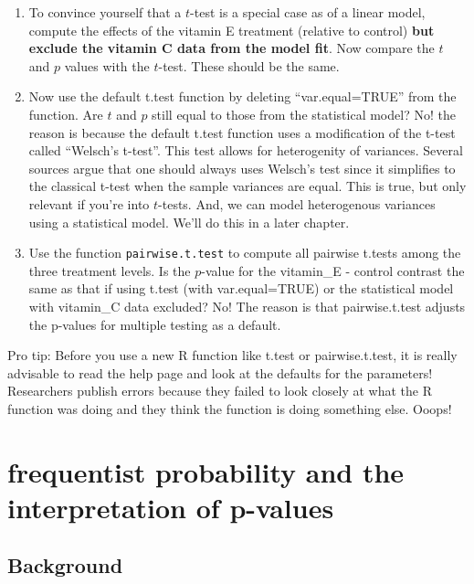 \documentclass[]{book}
\begin{document}
\begin{enumerate}
\def\labelenumi{\arabic{enumi}.}
\setcounter{enumi}{2}
\item
  To convince yourself that a \(t\)-test is a special case as of a
  linear model, compute the effects of the vitamin E treatment (relative
  to control) \textbf{but exclude the vitamin C data from the model
  fit}. Now compare the \(t\) and \(p\) values with the \(t\)-test.
  These should be the same.
\item
  Now use the default t.test function by deleting ``var.equal=TRUE''
  from the function. Are \(t\) and \(p\) still equal to those from the
  statistical model? No! the reason is because the default t.test
  function uses a modification of the t-test called ``Welsch's t-test''.
  This test allows for heterogenity of variances. Several sources argue
  that one should always uses Welsch's test since it simplifies to the
  classical t-test when the sample variances are equal. This is true,
  but only relevant if you're into \(t\)-tests. And, we can model
  heterogenous variances using a statistical model. We'll do this in a
  later chapter.
\item
  Use the function \texttt{pairwise.t.test} to compute all pairwise
  t.tests among the three treatment levels. Is the \(p\)-value for the
  vitamin\_E - control contrast the same as that if using t.test (with
  var.equal=TRUE) or the statistical model with vitamin\_C data
  excluded? No! The reason is that pairwise.t.test adjusts the p-values
  for multiple testing as a default.
\end{enumerate}

Pro tip: Before you use a new R function like t.test or pairwise.t.test,
it is really advisable to read the help page and look at the defaults
for the parameters! Researchers publish errors because they failed to
look closely at what the R function was doing and they think the
function is doing something else. Ooops!

\section{frequentist probability and the interpretation of
p-values}\label{frequentist-probability-and-the-interpretation-of-p-values}

\subsection{Background}\label{background}
\end{document}
